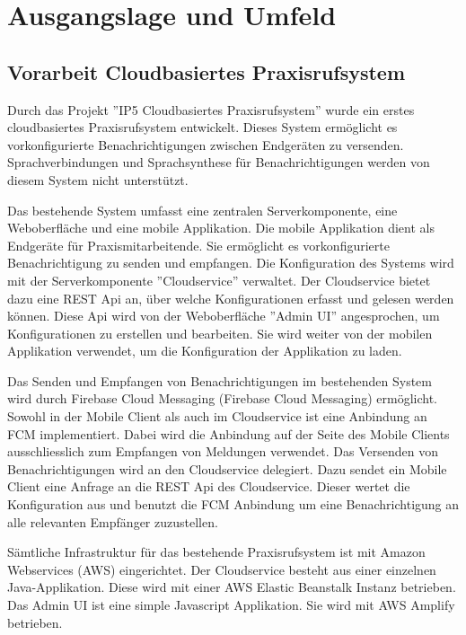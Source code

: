 \section{Ausgangslage und Umfeld}

\subsection{Vorarbeit Cloudbasiertes Praxisrufsystem}

Durch das Projekt ''IP5 Cloudbasiertes Praxisrufsystem'' wurde ein erstes cloudbasiertes Praxisrufsystem entwickelt.
Dieses System ermöglicht es vorkonfigurierte Benachrichtigungen zwischen Endgeräten zu versenden.
Sprachverbindungen und Sprachsynthese für Benachrichtigungen werden von diesem System nicht unterstützt.

Das bestehende System umfasst eine zentralen Serverkomponente, eine Weboberfläche und eine mobile Applikation.
Die mobile Applikation dient als Endgeräte für Praxismitarbeitende.
Sie ermöglicht es vorkonfigurierte Benachrichtigung zu senden und empfangen.
Die Konfiguration des Systems wird mit der Serverkomponente ''Cloudservice'' verwaltet.
Der Cloudservice bietet dazu eine REST Api an, über welche Konfigurationen erfasst und gelesen werden können.
Diese Api wird von der Weboberfläche ''Admin UI'' angesprochen, um Konfigurationen zu erstellen und bearbeiten.
Sie wird weiter von der mobilen Applikation verwendet, um die Konfiguration der Applikation zu laden.

Das Senden und Empfangen von Benachrichtigungen im bestehenden System wird durch Firebase Cloud Messaging (Firebase Cloud Messaging) ermöglicht.
Sowohl in der Mobile Client als auch im Cloudservice ist eine Anbindung an FCM implementiert.
Dabei wird die Anbindung auf der Seite des Mobile Clients ausschliesslich zum Empfangen von Meldungen verwendet.
Das Versenden von Benachrichtigungen wird an den Cloudservice delegiert.
Dazu sendet ein Mobile Client eine Anfrage an die REST Api des Cloudservice.
Dieser wertet die Konfiguration aus und benutzt die FCM Anbindung um eine Benachrichtigung an alle relevanten Empfänger zuzustellen.

Sämtliche Infrastruktur für das bestehende Praxisrufsystem ist mit Amazon Webservices (AWS) eingerichtet.
Der Cloudservice besteht aus einer einzelnen Java-Applikation.
Diese wird mit einer AWS Elastic Beanstalk Instanz betrieben.
Das Admin UI ist eine simple Javascript Applikation.
Sie wird mit AWS Amplify betrieben.\cite{ip5}

